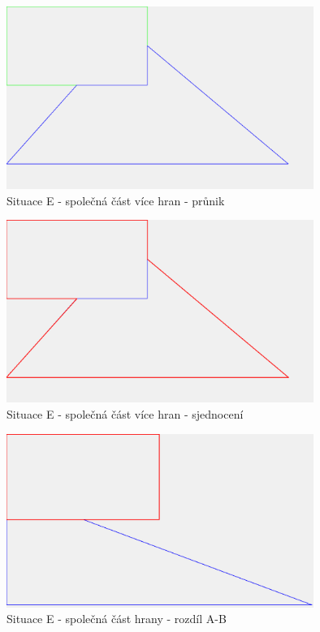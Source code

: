 \documentclass[a4paper,11pt,twoside]{article}
\begin{document}
\vspace{0.2cm}
\begin{figure}[hbt!] 
\begin{center}
\includegraphics[width=10cm]{pictures/E_more_intersect_v2.png} 
\caption[Situace E - společná část více hran - průnik]{Situace E - společná část více hran - průnik}
\label{fig:E_more_intersect}
\end{center}
\end{figure}

\vspace{0.2cm}
\begin{figure}[hbt!] 
\begin{center}
\includegraphics[width=10cm]{pictures/E_more_union_v2.png} 
\caption[Situace E - společná část více hran - sjednocení]{Situace E - společná část více hran - sjednocení}
\label{fig:E_more_union}
\end{center}
\end{figure}

\vspace{0.2cm}
\begin{figure}[hbt!] 
\begin{center}
\includegraphics[width=10cm]{pictures/E_diffAB.png} 
\caption[Situace E - společná část hrany - rozdíl A-B]{Situace E - společná část hrany - rozdíl A-B}
\label{fig:E_diffAB}
\end{center}
\end{figure}
\end{document}

